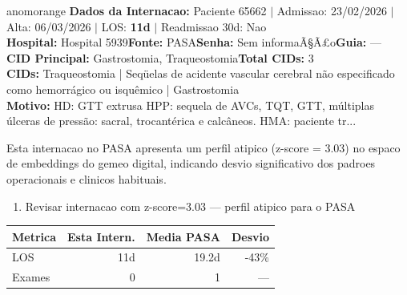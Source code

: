 \documentclass[a4paper,10pt]{article}
\begin{document}
\begin{anomalycard}[Internacao 184210 | PASA | ALTO (z=3.03)]{anomorange}
\textbf{Dados da Internacao:} Paciente 65662 $\mid$ Admissao: 23/02/2026 $\mid$ Alta: 06/03/2026 $\mid$ LOS: \textbf{11d} $\mid$ Readmissao 30d: Nao\\
\textbf{Hospital:} Hospital 5939\quad\textbf{Fonte:} PASA\quad\textbf{Senha:} Sem informaÃ§Ã£o\quad\textbf{Guia:} ---\\
\textbf{CID Principal:} {\small Gastrostomia, Traqueostomia}\quad\textbf{Total CIDs:} 3\\

\textbf{CIDs:} {\scriptsize Traqueostomia | Seqüelas de acidente vascular cerebral não especificado como hemorrágico ou isquêmico | Gastrostomia}\\

\textbf{Motivo:} {\scriptsize HD: GTT extrusa HPP: sequela de AVCs, TQT, GTT, múltiplas úlceras de pressão: sacral, trocantérica e calcâneos. HMA: paciente tr...}\\

\vspace{2pt}\begin{tcolorbox}[colback=severityred!20,colframe=anomorange,title={\textbf{Interpretacao de Negocio}},fonttitle=\bfseries\small,left=4pt,right=4pt,top=3pt,bottom=3pt]
{\small Esta internacao no PASA apresenta um perfil atipico (z-score = 3.03) no espaco de embeddings do gemeo digital, indicando desvio significativo dos padroes operacionais e clinicos habituais.}
\end{tcolorbox}
\begin{tcolorbox}[colback=severityyellow!30,colframe=anomorange,title={\textbf{Recomendacoes Especificas}},fonttitle=\bfseries\small,left=4pt,right=4pt,top=3pt,bottom=3pt]
\begin{enumerate}[nosep,leftmargin=16pt]
\item {\small Revisar internacao com z-score=3.03 --- perfil atipico para o PASA}
\end{enumerate}
\end{tcolorbox}
\begin{center}\begin{tabular}{l r r r}\toprule\textbf{Metrica} & \textbf{Esta Intern.} & \textbf{Media PASA} & \textbf{Desvio} \\\midrule
LOS & 11d & 19.2d & -43\% \\
Exames & 0 & 1 & --- \\
\bottomrule\end{tabular}\end{center}


\end{anomalycard}
\end{document}
